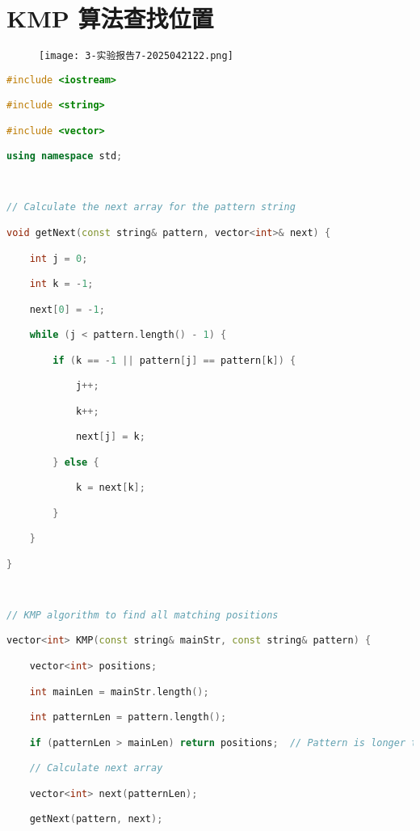 \section{KMP 算法查找位置}

\begin{figure}[H]
\centering
\texttt{[image: 3-实验报告7-2025042122.png]}
\label{}
\end{figure}

\begin{lstlisting}[language=C++]
#include <iostream>

#include <string>

#include <vector>

using namespace std;

  

// Calculate the next array for the pattern string

void getNext(const string& pattern, vector<int>& next) {

    int j = 0;

    int k = -1;

    next[0] = -1;

    while (j < pattern.length() - 1) {

        if (k == -1 || pattern[j] == pattern[k]) {

            j++;

            k++;

            next[j] = k;

        } else {

            k = next[k];

        }

    }

}

  

// KMP algorithm to find all matching positions

vector<int> KMP(const string& mainStr, const string& pattern) {

    vector<int> positions;

    int mainLen = mainStr.length();

    int patternLen = pattern.length();

    if (patternLen > mainLen) return positions;  // Pattern is longer than main string, no match possible

    // Calculate next array

    vector<int> next(patternLen);

    getNext(pattern, next);


\end{lstlisting}
